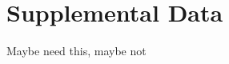 \documentclass{frontiersSCNS} %
\begin{document}
\section*{Supplemental Data}
Maybe need this, maybe not






\end{document}
